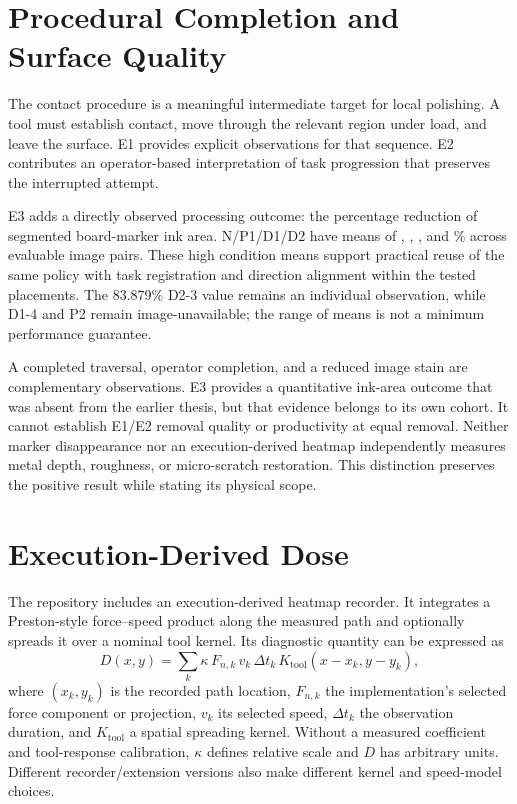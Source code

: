 \section{Procedural Completion and Surface Quality}
The contact procedure is a meaningful intermediate target for local polishing. A tool must establish contact, move through the relevant region under load, and leave the surface. E1 provides explicit observations for that sequence. E2 contributes an operator-based interpretation of task progression that preserves the interrupted attempt.

E3 adds a directly observed processing outcome: the percentage reduction of segmented board-marker ink area. N/P1/D1/D2 have means of \EthreeNRemoval, \EthreePoneRemoval, \EthreeDoneRemoval, and \EthreeDtwoRemoval\% across \EthreeImageN{} evaluable image pairs. These high condition means support practical reuse of the same policy with task registration and direction alignment within the tested placements. The 83.879\% D2-3 value remains an individual observation, while D1-4 and P2 remain image-unavailable; the range of means is not a minimum performance guarantee.

A completed traversal, operator completion, and a reduced image stain are complementary observations. E3 provides a quantitative ink-area outcome that was absent from the earlier thesis, but that evidence belongs to its own cohort. It cannot establish E1/E2 removal quality or productivity at equal removal. Neither marker disappearance nor an execution-derived heatmap independently measures metal depth, roughness, or micro-scratch restoration. This distinction preserves the positive result while stating its physical scope.

\section{Execution-Derived Dose}
\label{chap:removal_estimation}
The repository includes an execution-derived heatmap recorder. It integrates a Preston-style force--speed product along the measured path and optionally spreads it over a nominal tool kernel. Its diagnostic quantity can be expressed as
\begin{equation}
 D(x,y)=\sum_k\kappa\,F_{n,k}\,v_k\,\Delta t_k\,
                 K_{\mathrm{tool}}(x-x_k,y-y_k),
 \label{eq:preston_spatial}
\end{equation}
where \((x_k,y_k)\) is the recorded path location, \(F_{n,k}\) the implementation's selected force component or projection, \(v_k\) its selected speed, \(\Delta t_k\) the observation duration, and \(K_{\mathrm{tool}}\) a spatial spreading kernel. Without a measured coefficient and tool-response calibration, \(\kappa\) defines relative scale and \(D\) has arbitrary units. Different recorder/extension versions also make different kernel and speed-model choices.

